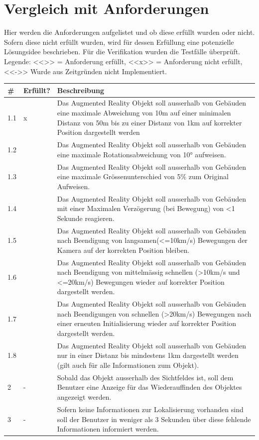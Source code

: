 \documentclass[a4paper]{scrreprt}
\begin{document}
\section{Vergleich mit Anforderungen}
\label{sec:VergleichAnforderungen}
Hier werden die Anforderungen aufgelistet und ob diese erfüllt wurden oder nicht. Sofern diese nicht erfüllt wurden, wird für dessen Erfüllung eine potenzielle Lösungsidee beschrieben. Für die Verifikation wurden die Testfälle überprüft.
\bigbreak
Legende:
<<\checkmark >> = Anforderung erfüllt, <<x>> = Anforderung nicht erfüllt, <<->> Wurde aus Zeitgründen nicht Implementiert.

\begin{tabularx}{\textwidth}{l l X}
\hline
	\# & \textbf{Erfüllt?} & \textbf{Beschreibung} \\
\hline
	1.1 & x & Das Augmented Reality Objekt soll ausserhalb von Gebäuden eine maximale Abweichung von 10m auf einer minimalen Distanz von 50m bis zu einer Distanz von 1km auf korrekter Position dargestellt werden \\
\hline
	1.2 & \checkmark & Das Augmented Reality Objekt soll ausserhalb von Gebäuden eine maximale Rotationsabweichung von \ang{10} aufweisen.\\
\hline
	1.3 & \checkmark & Das Augmented Reality Objekt soll ausserhalb von Gebäuden eine maximale Grössenunterschied von 5\% zum Original Aufweisen.\\
\hline
	1.4 & \checkmark & Das Augmented Reality Objekt soll ausserhalb von Gebäuden mit einer Maximalen Verzögerung (bei Bewegung) von <1 Sekunde reagieren.\\
\hline
	1.5 & \checkmark & Das Augmented Reality Objekt soll ausserhalb von Gebäuden nach Beendigung von langsamen(<=10km/s) Bewegungen der Kamera auf der korrekten Position bleiben.\\
\hline
	1.6 & \checkmark & Das Augmented Reality Objekt soll ausserhalb von Gebäuden nach Beendigung von mittelmässig schnellen (>10km/s und <=20km/s) Bewegungen wieder auf korrekter Position dargestellt werden.\\
\hline
	1.7 & \checkmark & Das Augmented Reality Objekt soll ausserhalb von Gebäuden nach Beendigungen von schnellen (>20km/s) Bewegungen nach einer erneuten Initialisierung wieder auf korrekter Position dargestellt werden.\\
\hline
	1.8 & \checkmark & Das Augmented Reality Objekt soll ausserhalb von Gebäuden nur in einer Distanz bis mindestens 1km dargestellt werden (gilt auch für alle Informationen zum Objekt).\\
\hline
	2 & - & Sobald das Objekt ausserhalb des Sichtfeldes ist, soll dem Benutzer eine Anzeige für das Wiederauffinden des Objektes angezeigt werden.\\
\hline
	3 & - & Sofern keine Informationen zur Lokalisierung vorhanden sind soll der Benutzer in weniger als 3 Sekunden über diese fehlende Informationen informiert werden. \\
\hline
\end{tabularx}
\end{document}

